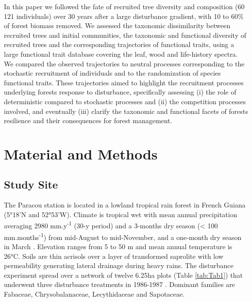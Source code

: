 \documentclass[fleqn,10pt]{ArtEcoFoG} %
\begin{document}
In this paper we followed the fate of recruited tree diversity and
composition (60 121 individuals) over 30 years after a large disturbance
gradient, with 10 to 60\% of forest biomass removed. We assessed the
taxonomic dissimilarity between recruited trees and initial communities,
the taxonomic and functional diversity of recruited trees and the
corresponding trajectories of functional traits, using a large
functional trait database covering the leaf, wood and life-history
spectra. We compared the observed trajectories to neutral processes
corresponding to the stochastic recruitment of individuals and to the
randomization of species functional traits. These trajectories aimed to
highlight the recruitment processes underlying forests response to
disturbance, specifically assessing (i) the role of deterministic
compared to stochastic processes and (ii) the competition processes
involved, and eventually (iii) clarify the taxonomic and functional
facets of forests resilience and their consequences for forest
management.

\section{Material and Methods}\label{material-and-methods}

\subsection{Study Site}\label{study-site}

The Paracou station is located in a lowland tropical rain forest in
French Guiana (5°18'N and 52°53'W). Climate is tropical wet with mean
annual precipitation averaging 2980 mm.y\textsuperscript{-1} (30-y
period) and a 3-months dry season (\textless{} 100
mm.months\textsuperscript{-1}) from mid-August to mid-November, and a
one-month dry season in March \citep{Wagner2011}. Elevation ranges from
5 to 50 m and mean annual temperature is 26°C. Soils are thin acrisols
over a layer of transformed saprolite with low permeability generating
lateral drainage during heavy rains. The disturbance experiment spread
over a network of twelve 6.25ha plots (Table \ref{tab:Tab1}) that
underwent three disturbance treatments in 1986-1987 \citep{Herault2018}.
Dominant families are Fabaceae, Chrysobalanaceae, Lecythidaceae and
Sapotaceae.
\end{document}

